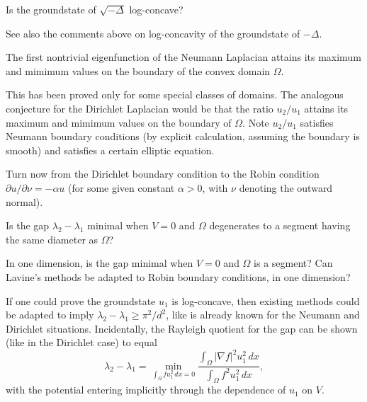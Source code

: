 \documentclass[12pt,letterpaper, reqno]{amsart}
\begin{document}
\begin{problemblock}
\begin{problem}[3.65]   
Is the groundstate of $\sqrt{-\Delta}$ log-concave?
\end{problem}
\begin{distinguishedremark}
See
also the comments above on log-concavity of the groundstate of
$-\Delta$.
\end{distinguishedremark}
\end{problemblock}

\begin{problemblock} 
\begin{conjecture}[3.7]  
The first nontrivial eigenfunction of the Neumann Laplacian attains
its maximum and mimimum values on the
boundary of the convex domain $\Omega$.
\end{conjecture}

\begin{distinguishedremark}
 This has been proved only for some special classes of
domains. The analogous conjecture for the Dirichlet Laplacian would
be that the ratio $u_2/u_1$ attains its maximum and mimimum values
on the boundary of $\Omega$. Note $u_2/u_1$ satisfies Neumann
boundary conditions (by explicit calculation, assuming the boundary
is smooth) and satisfies a certain elliptic equation.
\end{distinguishedremark}
\end{problemblock}

\begin{problemblock}
Turn now from the Dirichlet boundary condition to the Robin
condition $\partial u / \partial \nu = -\alpha u$ (for some given
constant $\alpha > 0$, with $\nu$ denoting the outward normal).

\begin{problem}[3.75]
Is
the gap $\lambda_2 - \lambda_1$ minimal when $V=0$ and $\Omega$
degenerates to a segment having the same diameter as $\Omega$?

In one dimension, is the gap minimal when $V=0$ and $\Omega$ is a
segment? Can Lavine's methods be adapted to Robin boundary
conditions, in one dimension?
\end{problem}
\begin{distinguishedremark}
If one could prove the groundstate $u_1$ is log-concave, then
existing methods could be adapted to imply $\lambda_2 - \lambda_1
\geq \pi^2/d^2$, like is already known for the Neumann and Dirichlet
situations. Incidentally, the Rayleigh quotient for the gap can be
shown (like in the Dirichlet case) to equal
\[
\lambda_2 - \lambda_1 = \min_{\int_\Omega f u_1^2 \, dx = 0}
\frac{\int_\Omega |\nabla f|^2 u_1^2 \, dx}{\int_\Omega f^2 u_1^2 \,
dx} ,
\]
with the potential entering implicitly through the dependence of
$u_1$ on $V$.
\end{distinguishedremark}
\end{problemblock}
\end{document}
